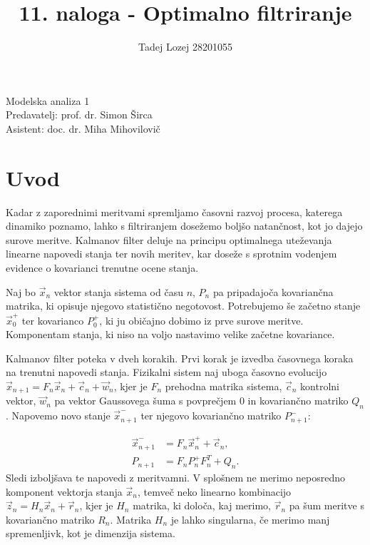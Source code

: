 \documentclass[slovene,11pt,a4paper]{article}
\begin{document}
\title{11. naloga - Optimalno filtriranje}
\author{Tadej Lozej 28201055}
\maketitle
\begin{center}
Modelska analiza 1 \\
\bigskip
Predavatelj: prof. dr. Simon Širca \\
Asistent: doc. dr. Miha Mihovilovič
\end{center}

\newpage

\tableofcontents

\newpage

\section{Uvod}


Kadar z zaporednimi meritvami spremljamo časovni razvoj procesa, katerega dinamiko poznamo, lahko s filtriranjem dosežemo boljšo natančnost, kot jo dajejo surove meritve. Kalmanov filter deluje na principu optimalnega uteževanja linearne napovedi stanja ter novih meritev, kar doseže s sprotnim vodenjem evidence o kovarianci trenutne ocene stanja.

Naj bo $\vec{x}_n$ vektor stanja sistema od času $n$, $P_n$ pa pripadajoča kovariančna matrika, ki opisuje njegovo statistično negotovost. Potrebujemo še začetno stanje $\vec{x}_0^+$ ter kovarianco $P_0^+$, ki ju običajno dobimo iz prve surove meritve. Komponentam stanja, ki niso na voljo nastavimo velike začetne kovariance.

Kalmanov filter poteka v dveh korakih. Prvi korak je izvedba časovnega koraka na trenutni napovedi stanja. Fizikalni sistem naj uboga časovno evolucijo $\vec{x}_{n+1} = F_n \vec{x}_n + \vec{c}_n + \vec{w}_n$, kjer je $F_n$ prehodna matrika sistema, $\vec{c}_n$ kontrolni vektor, $\vec{w}_n$ pa vektor Gaussovega šuma s povprečjem $0$ in kovariančno matriko $Q_n$. Napovemo novo stanje $\vec{x}_{n+1}^-$ ter njegovo kovariančno matriko $P_{n+1}^-$:

\begin{align}
\vec{x}_{n+1}^- &= F_n \vec{x}_n^+ + \vec{c}_n, \\
P_{n+1} &= F_n P_n^+ F_n^T + Q_n.
\end{align}
Sledi izboljšava te napovedi z meritvamni. V splošnem ne merimo neposredno komponent vektorja stanja $\vec{x}_n$, temveč neko linearno kombinacijo $\vec{z}_n = H_n \vec{x}_n + \vec{r}_n$, kjer je $H_n$ matrika, ki določa, kaj merimo, $\vec{r}_n$ pa šum meritve s kovariančno matriko $R_n$. Matrika $H_n$ je lahko singularna, če merimo manj spremenljivk, kot je dimenzija sistema.
\end{document}
